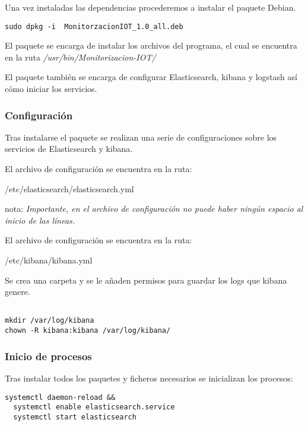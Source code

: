 Una vez instaladas las dependencias procederemos a instalar el paquete Debian.
 
\begin{lstlisting}[frame=single] 
sudo dpkg -i  MonitorzacionIOT_1.0_all.deb
\end{lstlisting}
 
El paquete se encarga de instalar los archivos del programa, el cual se encuentra en la ruta \textit{/usr/bin/Monitorizacion-IOT/}

El paquete también se encarga de configurar Elasticsearch, kibana y logstash así cómo iniciar los servicios.

\subsubsection{Configuración}
 
Tras instalarse el paquete se realizan una serie de configuraciones sobre los servicios de Elasticsearch y kibana.

 
El archivo de configuración se encuentra en la ruta:

/etc/elasticsearch/elasticsearch.yml

nota: \textit{Importante, en el archivo de configuración no puede haber ningún espacio al inicio de las líneas.}
 

El archivo de configuración se encuentra en la ruta:

/etc/kibana/kibana.yml
 
Se crea una carpeta y se le añaden permisos para guardar los logs que kibana genere.
 
\begin{lstlisting}[frame=single]  

mkdir /var/log/kibana
chown -R kibana:kibana /var/log/kibana/

\end{lstlisting}
 
 \subsubsection{Inicio de procesos}
 
 Tras instalar todos los paquetes y ficheros necesarios se inicializan los procesos:
 
 
 \begin{lstlisting}[frame=single]  
  systemctl daemon-reload && 
  systemctl enable elasticsearch.service
  systemctl start elasticsearch
\end{lstlisting}
 
